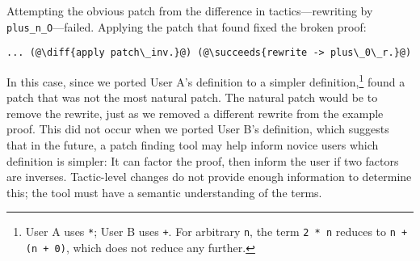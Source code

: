 Attempting the obvious patch from the difference in tactics---rewriting by \lstinline{plus_n_O}---failed.
Applying the patch that \sysname found fixed the broken proof:

\begin{lstlisting}[language=coq]
     ... (@\diff{apply patch\_inv.}@) (@\succeeds{rewrite -> plus\_0\_r.}@)
\end{lstlisting}


In this case, since we ported User A's definition to a simpler 
definition,\footnote{User A uses \lstinline{*}; User B uses \lstinline{+}. 
For arbitrary \lstinline{n}, the term \lstinline{2 * n} reduces to \lstinline{n + (n + 0)}, which does not reduce any further.}
\sysname found a patch that was not the most natural patch.
The natural patch would be to remove the rewrite, just as we removed a different rewrite from the example proof.
This did not occur when we ported User B's definition,
which suggests that in the future, a patch finding tool may help inform novice users which definition is simpler:
It can factor the proof, %
then inform the user if two factors are inverses. %
Tactic-level changes do not provide enough information to determine this; the tool must have a semantic
understanding of the terms.








